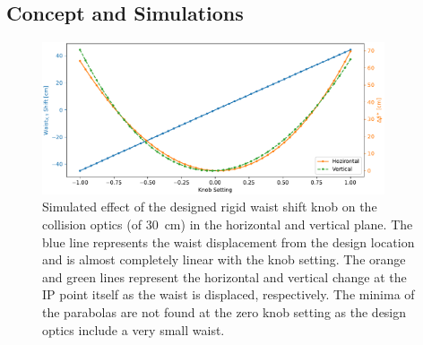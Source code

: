 \subsection{Concept and Simulations}

\begin{figure}
    \centering
    \includegraphics[width=0.9\textwidth]{Figures/Chapter4/rigid_waist_shift_effect_combined.pdf}
    \caption{Simulated effect of the designed rigid waist shift knob on the collision optics (\betastar of \qty{30}{\centi\metre}) in the horizontal and vertical plane. The blue line represents the waist displacement from the design location and is almost completely linear with the knob setting. The orange and green lines represent the horizontal and vertical \betafunctions change at the IP point itself as the waist is displaced, respectively. The minima of the parabolas are not found at the zero knob setting as the design optics include a very small waist.}
    \label{figure:rigid_waist_shift_knob_effect1}
\end{figure}

